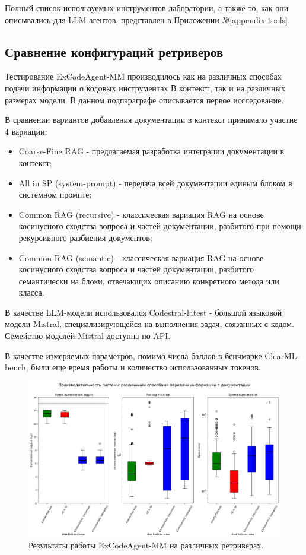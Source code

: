 Полный список используемых инструментов лаборатории, а также то, как они описывались для LLM-агентов, 
представлен в Приложении №\ref{appendix-tools}.

\subsection{Сравнение конфигураций ретриверов} \label{ch4:sec1:subsec3}

Тестирование ExCodeAgent-MM производилось как на различных способах подачи информации о кодовых инструментах В
контекст, так и на различных размерах модели. В данном подпараграфе описывается первое исследование.

В сравнении вариантов добавления документации в контекст принимало участие 4 вариации:
\begin{itemize}
	\item Coarse-Fine RAG - предлагаемая разработка интеграции документации в контекст;
	\item All in SP (system-prompt) - передача всей документации единым блоком в системном промпте;
	\item Common RAG (recursive) - классическая вариация RAG на основе косинусного сходства вопроса и частей
документации, разбитого при помощи рекурсивного разбиения документов;
	\item Common RAG (semantic) - классическая вариация RAG на основе косинусного сходства вопроса и частей
документации, разбитого семантически на блоки, отвечающих описанию конкретного метода или класса.
\end{itemize}

В качестве LLM-модели использовался Codestral-latest - большой языковой модели Mistral, специализирующейся
на выполнения задач, связанных с кодом. Семейство моделей Mistral доступна по API.

В качестве измеряемых параметров, помимо числа баллов в бенчмарке ClearML-bench, были
еще время работы и количество использованных токенов.

\begin{figure}
    \center
	\includegraphics[scale=0.42]{sources/stats_1.png}
	\caption{Результаты работы ExCodeAgent-MM на различных ретриверах.} 
	\label{fig:ch4:rags}  
\end{figure}

